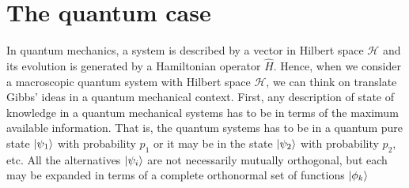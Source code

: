 \section{The quantum case}

In quantum mechanics, a system is described by a vector in Hilbert space $\mathcal{H}$ and its evolution is generated by a Hamiltonian operator $\hat{H}$. Hence, when we consider a macroscopic quantum system with Hilbert space $\mathcal{H}$, we can think on translate Gibbs' ideas in a quantum mechanical context. First, any description of state of knowledge in a quantum mechanical systems has to be in terms of the maximum available information\cite{PhysRev.108.171}. That is, the quantum systems has to be in a quantum pure state $\mathinner{|{\psi_1}\rangle}$ with probability $p_1$ or it may be in the state $\mathinner{|{\psi_2}\rangle}$ with probability $p_2$, etc. All the alternatives $\mathinner{|{\psi_i}\rangle}$ are not necessarily mutually orthogonal, but each may be expanded in terms of a complete orthonormal set of functions $\mathinner{|{\phi_k}\rangle}$

